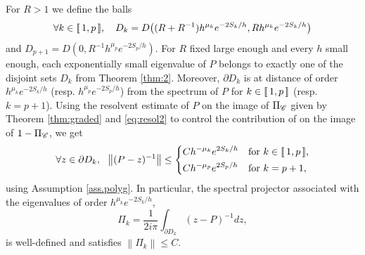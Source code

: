 \documentclass[12pt]{amsart}
\numberwithin{equation}{section}
\numberwithin{figure}{section}
\newcommand{\vvert}[1]{\left\lVert#1\right\rVert}
\newcommand{\lb}{\operatorname{[\negthinspace [}}
\newcommand{\rb}{\operatorname{]\negthinspace ]}}
\begin{document}
For $R>1$ we define the balls
\begin{equation*}
\forall k\in\lb1,p\rb,\ \ \ D_k = D\big((R+R^{-1})h^{\mu_k}e^{-2S_k/h},Rh^{\mu_k}e^{-2S_k/h}\big)
\end{equation*}
and $D_{p+1} = D(0,R^{-1}h^{\mu_p}e^{-2S_{p}/h})$. For $R$ fixed large enough and every $h$ small enough, each exponentially small eigenvalue of $P$ belongs to exactly one of the disjoint sets $D_k$ from Theorem \ref{thm:2}. Moreover, $\partial D_k$ is at distance of order $h^{\mu_k}e^{-2S_k/h}$ (resp. $h^{\mu_p}e^{-2S_{p}/h}$) from the spectrum of $P$ for $k\in\lb1,p\rb$ (resp. $k=p+1$). Using the resolvent estimate of $P$ on the image of $\Pi_{\mathscr C}$ given by Theorem \ref{thm:graded} and \eqref{eq:resol2} to control the contribution of on the image of $1-\Pi_{\mathscr C}$, we get
\begin{equation}\label{eq:resol3}
\forall z\in \partial D_k,\ \ \vvert{(P-z)^{-1}}\leq \left\{
\begin{aligned}
    &Ch^{-\mu_k}e^{2S_k/h}&&\text{for }k\in\lb1,p\rb,\\
    &Ch^{-\mu_p}e^{2S_{p}/h}&&\text{for }k=p+1,
\end{aligned}
\right.
\end{equation}
using Assumption \ref{ass.polyg}. In particular, the spectral projector associated with the eigenvalues of order $h^{\mu_k}e^{-2S_k/h}$,
\begin{equation*}
\Pi_k = \frac{1}{2i\pi}\int_{\partial D_k}(z-P)^{-1}dz,
\end{equation*}
is well-defined and satisfies $\vvert{\Pi_k}\leq C$.
\end{document}
